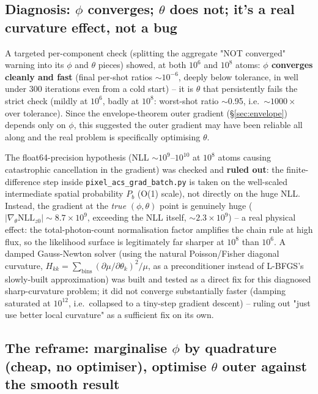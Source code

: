 \documentclass[11pt,a4paper]{article}
\newcommand{\code}[1]{\texttt{#1}}
\begin{document}
\subsection{Diagnosis: $\phi$ converges; $\theta$ does not; it's a real
curvature effect, not a bug}
\label{sec:2026-07-20-diagnosis}

A targeted per-component check (splitting the aggregate "NOT converged"
warning into its $\phi$ and $\theta$ pieces) showed, at both $10^6$ and
$10^8$ atoms: \textbf{$\phi$ converges cleanly and fast} (final per-shot
ratios $\sim10^{-6}$, deeply below tolerance, in well under 300 iterations
even from a cold start) -- it is \textbf{$\theta$} that persistently fails
the strict check (mildly at $10^6$, badly at $10^8$: worst-shot ratio
$\sim$0.95, i.e.\ $\sim1000\times$ over tolerance). Since the
envelope-theorem outer gradient (\S\ref{sec:envelope}) depends only on
$\phi$, this suggested the outer gradient may have been reliable all along
and the real problem is specifically optimising $\theta$.

The float64-precision hypothesis (NLL $\sim10^9$--$10^{10}$ at $10^8$
atoms causing catastrophic cancellation in the gradient) was checked and
\textbf{ruled out}: the finite-difference step inside
\code{pixel\_acs\_grad\_batch.py} is taken on the well-scaled intermediate
spatial probability $P_b$ (O(1) scale), not directly on the huge NLL.
Instead, the gradient at the \emph{true} $(\phi,\theta)$ point is
genuinely huge ($|\nabla_\theta \mathrm{NLL}_{z0}|\sim8.7\times10^9$,
exceeding the NLL itself, $\sim2.3\times10^9$) -- a real physical effect:
the total-photon-count normalisation factor amplifies the chain rule at
high flux, so the likelihood surface is legitimately far sharper at
$10^8$ than $10^6$. A damped Gauss-Newton solver (using the natural
Poisson/Fisher diagonal curvature, $H_{kk}=\sum_{\text{bins}}(\partial\mu/\partial\theta_k)^2/\mu$,
as a preconditioner instead of L-BFGS's slowly-built approximation) was
built and tested as a direct fix for this diagnosed sharp-curvature
problem; it did not converge substantially faster (damping saturated at
$10^{12}$, i.e.\ collapsed to a tiny-step gradient descent) -- ruling out
"just use better local curvature" as a sufficient fix on its own.

\subsection{The reframe: marginalise $\phi$ by quadrature (cheap, no
optimiser), optimise $\theta$ outer against the smooth result}
\label{sec:2026-07-20-reframe}
\end{document}
